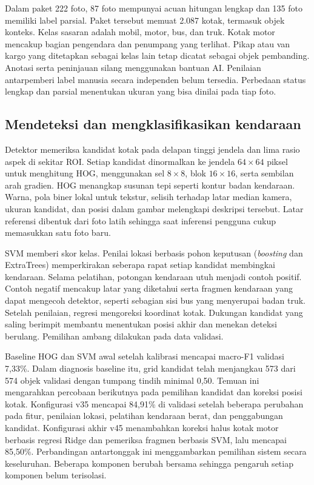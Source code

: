 \documentclass[conference,a4paper]{IEEEtran}
\begin{document}
Dalam paket 222 foto, 87 foto mempunyai acuan hitungan lengkap dan 135 foto memiliki label parsial. Paket tersebut memuat 2.087 kotak, termasuk objek konteks. Kelas sasaran adalah mobil, motor, bus, dan truk. Kotak motor mencakup bagian pengendara dan penumpang yang terlihat. Pikap atau van kargo yang ditetapkan sebagai kelas lain tetap dicatat sebagai objek pembanding. Anotasi serta peninjauan silang menggunakan bantuan AI. Penilaian antarpemberi label manusia secara independen belum tersedia. Perbedaan status lengkap dan parsial menentukan ukuran yang bisa dinilai pada tiap foto.

\subsection{Mendeteksi dan mengklasifikasikan kendaraan}
Detektor memeriksa kandidat kotak pada delapan tinggi jendela dan lima rasio aspek di sekitar ROI. Setiap kandidat dinormalkan ke jendela $64\times64$ piksel untuk menghitung HOG, menggunakan sel $8\times8$, blok $16\times16$, serta sembilan arah gradien. HOG menangkap susunan tepi seperti kontur badan kendaraan. Warna, pola biner lokal untuk tekstur, selisih terhadap latar median kamera, ukuran kandidat, dan posisi dalam gambar melengkapi deskripsi tersebut. Latar referensi dibentuk dari foto latih sehingga saat inferensi pengguna cukup memasukkan satu foto baru.

SVM memberi skor kelas. Penilai lokasi berbasis pohon keputusan (\textit{boosting} dan ExtraTrees) memperkirakan seberapa rapat setiap kandidat membingkai kendaraan. Selama pelatihan, potongan kendaraan utuh menjadi contoh positif. Contoh negatif mencakup latar yang diketahui serta fragmen kendaraan yang dapat mengecoh detektor, seperti sebagian sisi bus yang menyerupai badan truk. Setelah penilaian, regresi mengoreksi koordinat kotak. Dukungan kandidat yang saling berimpit membantu menentukan posisi akhir dan menekan deteksi berulang. Pemilihan ambang dilakukan pada data validasi.

Baseline HOG dan SVM awal setelah kalibrasi mencapai macro-F1 validasi 7,33\%. Dalam diagnosis baseline itu, grid kandidat telah menjangkau 573 dari 574 objek validasi dengan tumpang tindih minimal 0,50. Temuan ini mengarahkan percobaan berikutnya pada pemilihan kandidat dan koreksi posisi kotak. Konfigurasi v35 mencapai 84,91\% di validasi setelah beberapa perubahan pada fitur, penilaian lokasi, pelatihan kendaraan berat, dan penggabungan kandidat. Konfigurasi akhir v45 menambahkan koreksi halus kotak motor berbasis regresi Ridge dan pemeriksa fragmen berbasis SVM, lalu mencapai 85,50\%. Perbandingan antartonggak ini menggambarkan pemilihan sistem secara keseluruhan. Beberapa komponen berubah bersama sehingga pengaruh setiap komponen belum terisolasi.
\end{document}
